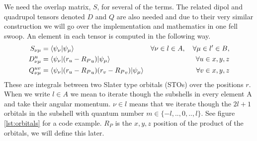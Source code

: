 We need the overlap matrix, $S$, for several of the terms.
The related dipol and quadrupol tensors denoted $D$ and $Q$ are also needed and due to their very similar construction we will go over the implementation and mathematics in one fell swoop. 
An element in each tensor is computed in the following way.
\begin{align}
    S_{\nu\mu} &= \braket{\psi_\nu|\psi_\mu} &\forall \nu \in l \in A,\quad\forall\mu \in l' \in B, \\
    D_{\nu\mu}^{u} &= \braket{\psi_\nu|(r_u-{R_P}_u)|\psi_\mu}  &\forall  u\in x,y,z\\
    Q_{\nu\mu}^{uv} &= \braket{\psi_\nu|(r_u-{R_P}_u)(r_v-{R_P}_v)|\psi_\mu} &\forall  v\in x,y,z
\end{align}
These are integrals between two Slater type orbitals (STOs) over the positions $r$. When we write $l \in A$ we mean to iterate though the subshells in every element A and take their angular momentum. $\nu\in l$ means that we iterate though the $2l+1$ orbitals in the subshell with quantum number $m\in\{-l,..,0,..,l\}$. See figure \ref{lst:orbitals} for a code example. ${R_P}$ is the $x,y,z$ position of the product of the orbitals, we will define this later.


